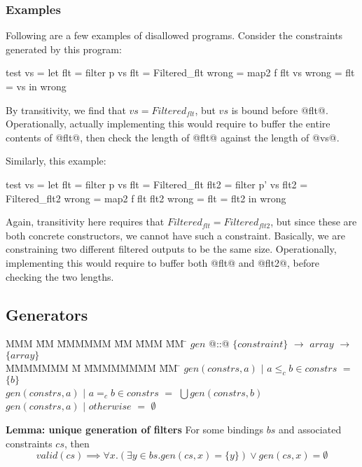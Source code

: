 \subsubsection{Examples}
Following are a few examples of disallowed programs.
Consider the constraints generated by this program:
\begin{code}
test vs    =
 let flt   = filter p vs        { flt   = Filtered_flt }
     wrong = map2   f flt vs    { wrong = flt = vs     }
 in  wrong
\end{code}
By transitivity, we find that $vs = Filtered_{flt}$, but $vs$ is bound before @flt@.
Operationally, actually implementing this would require to buffer the entire contents of @flt@, then check the length of @flt@ against the length of @vs@.


Similarly, this example:
\begin{code}
test vs    =
 let flt   = filter p  vs       { flt   = Filtered_flt  }
     flt2  = filter p' vs       { flt2  = Filtered_flt2 }
     wrong = map2   f  flt flt2 { wrong = flt = flt2    }
 in  wrong
\end{code}
Again, transitivity here requires that $Filtered_{flt} = Filtered_{flt2}$, but since these are both concrete constructors, we cannot have such a constraint.
Basically, we are constraining two different filtered outputs to be the same size.
Operationally, implementing this would require to buffer both @flt@ and @flt2@, before checking the two lengths.

\subsection{Generators}

\begin{tabbing}
MMM       \= MM \= MMMMMM \= MM \= MMM \= MM \= \kill
$gen$   \> @::@  \> $\{constraint\}$  \> $\to$ \> $array$ \> $\to$ \> $\{array\}$ \\
MMMMMMM                 \= M  \= MMMMMMMM \= MM \= \kill
$gen(constrs, a)$ \> $|$ \> $a \le_c b \in constrs$ \> $=$ \> $\{b\}$                        \\
$gen(constrs, a)$ \> $|$ \> $a =_c b \in constrs$   \> $=$ \> $\bigcup gen(constrs, b)$                        \\
$gen(constrs, a)$ \> $|$ \> $otherwise$             \> $=$ \> $\emptyset$                        \\
\end{tabbing}

\textbf{Lemma: unique generation of filters}
For some bindings $bs$ and associated constraints $cs$, then
\[
valid(cs) \implies \forall x. (\exists y \in bs. gen(cs, x) = \{y\}) \vee gen(cs, x) = \emptyset
\]

